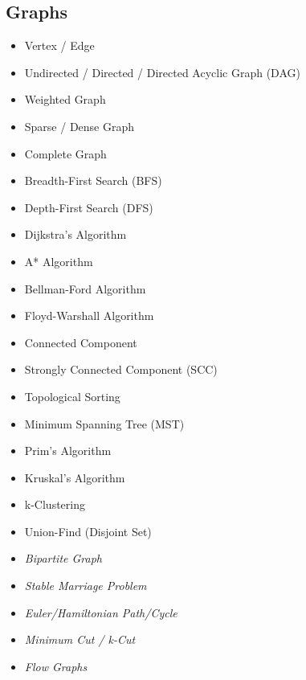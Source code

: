 \documentclass[10pt,a4paper]{article}
\begin{document}
\begin{landscape}
\begin{multicols*}{4}
\subsection*{Graphs}
\begin{itemize}
    \item Vertex / Edge
    \item Undirected / Directed / Directed Acyclic Graph (DAG)
    \item Weighted Graph
    \item Sparse / Dense Graph
    \item Complete Graph
    \item Breadth-First Search (BFS)
    \item Depth-First Search (DFS)
    \item Dijkstra's Algorithm
    \item A* Algorithm
    \item Bellman-Ford Algorithm
    \item Floyd-Warshall Algorithm
    \item Connected Component
    \item Strongly Connected Component (SCC)
    \item Topological Sorting
    \item Minimum Spanning Tree (MST)
    \item Prim's Algorithm
    \item Kruskal's Algorithm
    \item k-Clustering
    \item Union-Find (Disjoint Set)
    \item \textit{Bipartite Graph}
    \item \textit{Stable Marriage Problem}
    \item \textit{Euler/Hamiltonian Path/Cycle }
    \item \textit{Minimum Cut / k-Cut}
    \item \textit{Flow Graphs}
\end{itemize}


\end{multicols*}
\end{landscape}
\end{document}
